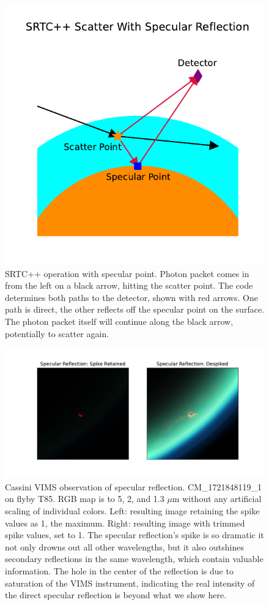 \documentclass[twocolumn,linenumbers]{aastex631}
\begin{document}
\begin{figure}[htbp]
\includegraphics[scale = 0.55]{SRTCSpec.pdf}
\centering
\caption{SRTC++ operation with specular point. Photon packet comes in from the left on a black arrow, hitting the scatter point. The code determines both paths to the detector, shown with red arrows. One path is direct, the other reflects off the specular point on the surface. The photon packet itself will continue along the black arrow, potentially to scatter again.}
\label{fig:2}
\end{figure}

\begin{figure}[htbp]
\includegraphics[scale = 0.35]{SpecSpikeNoSpike.pdf}
\centering
\caption{Cassini VIMS observation of specular reflection. CM\_1721848119\_1 on flyby T85. RGB map is to 5, 2, and 1.3 $\mu$m without any artificial scaling of individual colors. Left: resulting image retaining the spike values as 1, the maximum. Right: resulting image with trimmed spike values, set to 1. The specular reflection's spike is so dramatic it not only drowns out all other wavelengths, but it also outshines secondary reflections in the same wavelength, which contain valuable information. The hole in the center of the reflection is due to saturation of the VIMS instrument, indicating the real intensity of the direct specular reflection is beyond what we show here.}
\label{fig:3}
\end{figure}
\end{document}
